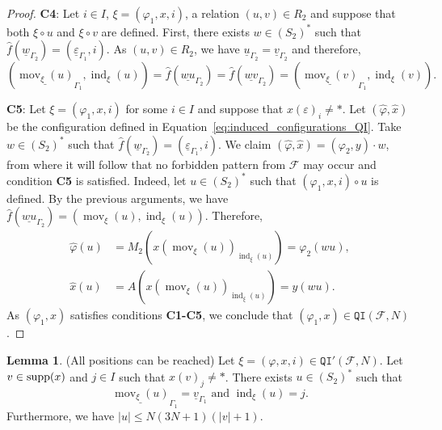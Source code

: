\documentclass{article}
\theoremstyle{definition}
\newtheorem{lemma}[theorem]{Lemma}
\theoremstyle{definition}
\newcommand{\FF}{\mathcal{F}}
\newcommand{\Fo}{\mathcal{F}}
\newcommand{\QI}{\mathtt{QI}}
\newcommand{\mov}{\operatorname{mov}}
\newcommand{\ind}{\operatorname{ind}}
\newcommand{\supp}{\textnormal{supp}}
\newcommand{\todo}[1]{\textcolor{red}{\textnormal{TODO: #1}}}
\begin{document}
\begin{proof}
 
 \noindent
 \textbf{C4}: Let $i \in I$, $\xi=(\varphi_1,x,i)$, a relation $(u,v)\in R_2$ and suppose that both $\xi\circ u$ and $\xi\circ v$ are defined. First, there exists $w\in (S_2)^*$ such that $\widehat{f}(\underline{w}_{\Gamma_2}) = (\underline{\varepsilon}_{\Gamma_1}, i)$. As $(u,v) \in R_2$, we have $\underline{u}_{\Gamma_2} = \underline{v}_{\Gamma_2}$ and therefore, $$(\underline{\mov_{\xi}(u)}_{\Gamma_1},\ind_{\xi}(u)) = \widehat{f}(\underline{wu}_{\Gamma_2}) = \widehat{f}(\underline{wv}_{\Gamma_2}) = (\underline{\mov_{\xi}(v)}_{\Gamma_1},\ind_{\xi}(v)).$$


  \noindent
 \textbf{C5}: Let $\xi = (\varphi_1,x,i)$ for some $i \in I$ and suppose that $x(\varepsilon)_i \neq \ast$. Let $(\widehat{\varphi}, \widehat{x})$ be the configuration defined in Equation~\eqref{eq:induced_configurations_QI}. Take $w\in (S_2)^*$ such that $\widehat{f}(\underline{w}_{\Gamma_2}) = (\underline{\varepsilon}_{\Gamma_1}, i)$. We claim $(\widehat{\varphi},\widehat{x}) = (\varphi_2,y)\cdot w$, from where it will follow that no forbidden pattern from $\FF$ may occur and condition \textbf{C5} is satisfied. Indeed, let $u \in (S_2)^*$ such that $(\varphi_1, x, i)\circ u$ is defined. By the previous arguments, we have $\widehat{f}(\underline{wu}_{\Gamma_2})=(\mov_{\xi}(u),\ind_{\xi}(u))$. Therefore, 
 \begin{align*}
     \widehat{\varphi}(u) & = M_2(x(\mov_{\xi}(u))_{\ind_{\xi}(u)}) = \varphi_2(wu),\\
     \widehat{x}(u) & = A(x(\mov_{\xi}(u))_{\ind_{\xi}(u)}) = y(wu).
 \end{align*}
As $(\varphi_1,x)$ satisfies conditions \textbf{C1-C5}, we conclude that $(\varphi_1,x) \in \QI(\Fo,N)$.
\end{proof}


\begin{lemma} (All positions can be reached)
\label{lem:interpolacion}
    Let ${\xi} = (\varphi,x,i)\in \QI'(\Fo,N)$. Let $v \in \supp(x)$ and $j \in I$ such that $x(v)_j \neq \ast$. There exists $u \in (S_2)^*$ such that \[ \underline{\mov_{\xi}(u)}_{\Gamma_1} = \underline{v}_{\Gamma_1} \mbox{ and } \ind_{\xi}(u) = j.  \]
Furthermore, we have $|u| \leq N(3N+1)(|v|+1)$.
\end{lemma}
\end{document}
